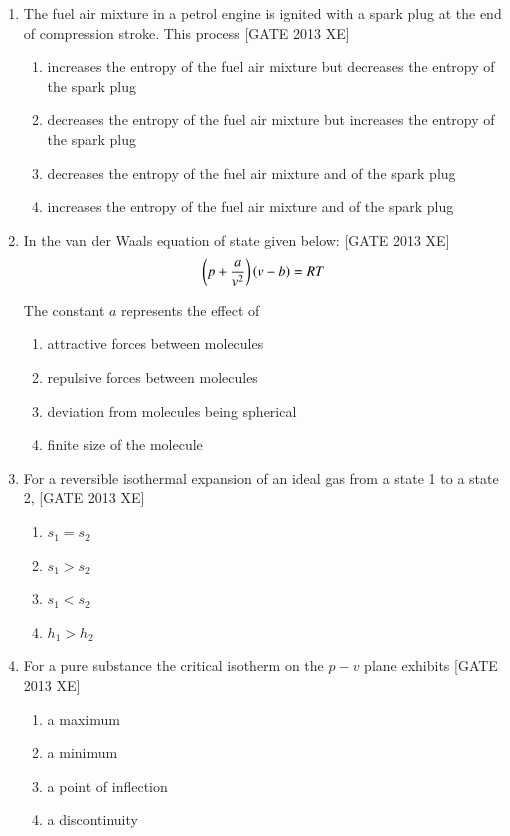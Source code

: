 \documentclass[journal,12pt,onecolumn]{IEEEtran}
\theoremstyle{remark}
\begin{document}
\begin{enumerate}
\item The fuel air mixture in a petrol engine is ignited with a spark plug at the end of compression stroke. This process \hfill[GATE 2013 XE]
\begin{multicols}{2}
\begin{enumerate}
\item increases the entropy of the fuel air mixture but decreases the entropy of the spark plug
\item decreases the entropy of the fuel air mixture but increases the entropy of the spark plug
\item decreases the entropy of the fuel air mixture and of the spark plug
\item increases the entropy of the fuel air mixture and of the spark plug
\end{enumerate}
\end{multicols}

\item In the van der Waals equation of state given below: \hfill[GATE 2013 XE]
\begin{align}
    \left(p + \frac{a}{v^2}\right)\left(v - b\right) = RT
\end{align}

The constant $a$ represents the effect of
\begin{multicols}{2}
\begin{enumerate}
\item attractive forces between molecules
\item repulsive forces between molecules
\item deviation from molecules being spherical
\item finite size of the molecule
\end{enumerate}
\end{multicols}

\item For a reversible isothermal expansion of an ideal gas from a state 1 to a state 2, \hfill[GATE 2013 XE]
\begin{multicols}{4}
\begin{enumerate}
\item $s_1 = s_2$
\item $s_1 > s_2$
\item $s_1 < s_2$
\item $h_1 > h_2$
\end{enumerate}
\end{multicols}

\item For a pure substance the critical isotherm on the $p-v$ plane exhibits \hfill[GATE 2013 XE]
\begin{multicols}{4}
\begin{enumerate}
\item a maximum
\item a minimum
\item a point of inflection
\item a discontinuity
\end{enumerate}
\end{multicols}


\end{enumerate}
\end{document}
